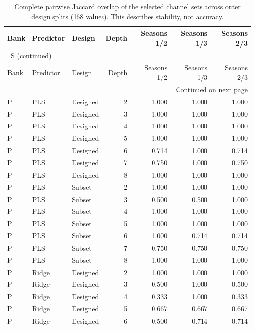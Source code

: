 \documentclass[10pt,a4paper]{article}
\renewcommand{\thetable}{S\arabic{table}}
\begin{document}
\begingroup\footnotesize
\setlength{\tabcolsep}{3.5pt}
\renewcommand{\arraystretch}{1.10}
\begin{longtable}{lllrrrr}
\caption{Complete pairwise Jaccard overlap of the selected channel sets across outer design splits (168 values). This describes stability, not accuracy.}\label{tab:stability}\\
\toprule
Bank & Predictor & Design & Depth & Seasons 1/2 & Seasons 1/3 & Seasons 2/3 \\
\midrule
\endfirsthead
\multicolumn{7}{l}{\tablename~\thetable{} (continued)}\\
\toprule
Bank & Predictor & Design & Depth & Seasons 1/2 & Seasons 1/3 & Seasons 2/3 \\
\midrule
\endhead
\midrule
\multicolumn{7}{r}{Continued on next page}\\
\endfoot
\bottomrule
\endlastfoot
P & PLS & Designed & 2 & 1.000 & 1.000 & 1.000 \\
P & PLS & Designed & 3 & 1.000 & 1.000 & 1.000 \\
P & PLS & Designed & 4 & 1.000 & 1.000 & 1.000 \\
P & PLS & Designed & 5 & 1.000 & 1.000 & 1.000 \\
P & PLS & Designed & 6 & 0.714 & 1.000 & 0.714 \\
P & PLS & Designed & 7 & 0.750 & 1.000 & 0.750 \\
P & PLS & Designed & 8 & 1.000 & 1.000 & 1.000 \\
P & PLS & Subset & 2 & 1.000 & 1.000 & 1.000 \\
P & PLS & Subset & 3 & 0.500 & 0.500 & 1.000 \\
P & PLS & Subset & 4 & 1.000 & 1.000 & 1.000 \\
P & PLS & Subset & 5 & 1.000 & 1.000 & 1.000 \\
P & PLS & Subset & 6 & 1.000 & 0.714 & 0.714 \\
P & PLS & Subset & 7 & 0.750 & 0.750 & 0.750 \\
P & PLS & Subset & 8 & 1.000 & 1.000 & 1.000 \\
P & Ridge & Designed & 2 & 1.000 & 1.000 & 1.000 \\
P & Ridge & Designed & 3 & 0.500 & 1.000 & 0.500 \\
P & Ridge & Designed & 4 & 0.333 & 1.000 & 0.333 \\
P & Ridge & Designed & 5 & 0.667 & 0.667 & 0.667 \\
P & Ridge & Designed & 6 & 0.500 & 0.714 & 0.714 \\

\end{longtable}
\end{document}
